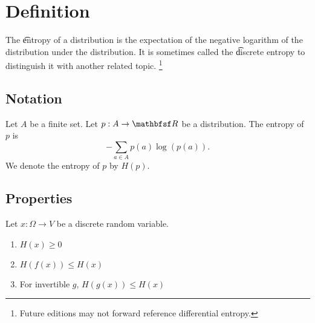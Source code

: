 
\section*{Definition}

The \t{entropy} of a distribution is the expectation of the negative logarithm of the distribution under the distribution.
It is sometimes called the \t{discrete entropy} to distinguish it with another related topic.
  \ifhmode\unskip\fi\footnote{
Future editions may not forward reference differential entropy.
  }

\subsection*{Notation}

Let $A$ be a finite set.
Let $p:A \to \R $ be a distribution.
The entropy of $p$ is
  \[
-\sum_{a \in A} p(a) \log(p(a)).
  \]
We denote the entropy of $p$ by
$H(p)$.

\subsection*{Properties}

Let $x: \Omega  \to V$ be a discrete random variable.
  \begin{enumerate}
  \item $H(x) \geq 0$
  \item $H(f(x)) \leq H(x)$
  \item For invertible $g$, $H(g(x)) \leq H(x)$

  \end{enumerate}

\blankpage